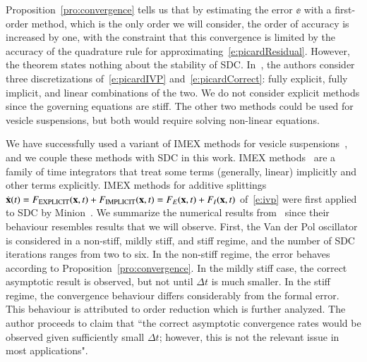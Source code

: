 
Proposition~\ref{pro:convergence} tells us that by estimating the error
$\ee$ with a first-order method, which is the only order we will
consider, the order of accuracy is increased by one, with the constraint
that this convergence is limited by the accuracy of the quadrature rule
for approximating~\eqref{e:picardResidual}.  However, the theorem states
nothing about the stability of SDC.  In~\cite{dut:gre:rok2000}, the
authors consider three discretizations of~\eqref{e:picardIVP}
and~\eqref{e:picardCorrect}: fully explicit, fully implicit, and linear
combinations of the two.  We do not consider explicit methods since the
governing equations are stiff.  The other two methods could be used for
vesicle suspensions, but both would require solving non-linear
equations.

We have successfully used a variant of IMEX methods for vesicle
suspensions~\cite{qua:bir2014b, rah:vee:bir2010, vee:gue:zor:bir2009},
and we couple these methods with SDC in this work.  IMEX
methods~\cite{asc:ruu:wet1995} are a family of time integrators that
treat some terms (generally, linear) implicitly and other terms
explicitly.  IMEX methods for additive splittings $\dot{{\mathbf{x}}}(t) =
F_{\mathrm{EXPLICIT}}({\mathbf{x}},t) + F_{\mathrm{IMPLICIT}}({\mathbf{x}},t) =
F_{E}({\mathbf{x}},t) + F_{I}({\mathbf{x}},t)$ of~\eqref{e:ivp} were first applied to SDC
by Minion~\cite{min2003}.  We summarize the numerical results
from~\cite{min2003} since their behaviour resembles results that we
will observe.  First, the Van der Pol oscillator is considered in a
non-stiff, mildly stiff, and stiff regime, and the number of SDC
iterations ranges from two to six.  In the non-stiff regime, the error
behaves according to Proposition~\ref{pro:convergence}.  In the mildly
stiff case, the correct asymptotic result is observed, but not until
$\Delta t$ is much smaller.  In the stiff regime, the convergence
behaviour differs considerably from the formal error.  This behaviour
is attributed to order reduction which is further analyzed.  The author
proceeds to claim that ``the correct asymptotic convergence rates would
be observed given sufficiently small $\Delta t$; however, this is not
the relevant issue in most applications".

